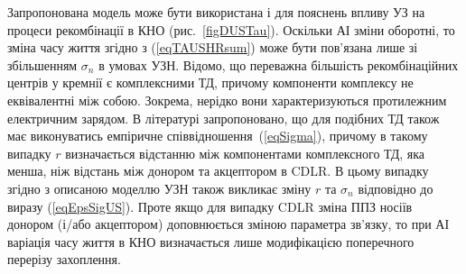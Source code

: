 Запропонована модель може бути використана і для пояснень впливу УЗ на процеси рекомбінації в КНО (рис.~\ref{figDUSTau}).
Оскільки АІ зміни оборотні, то зміна часу життя згідно з (\ref{eqTAUSHRsum}) може бути пов'язана лише зі збільшенням
$\sigma_n$ в умовах УЗН.
Відомо, що переважна більшість рекомбінаційних центрів у кремнії є комплексними ТД,
причому компоненти комплексу не еквівалентні між собою.
Зокрема, нерідко вони характеризуються протилежним електричним зарядом.
В літературі \cite{CDLR:R2} запропоновано, що для подібних ТД також має виконуватись емпіричне співвідношення~(\ref{eqSigma}),
причому в такому випадку $r$ визначається відстанню між компонентами комплексного ТД, яка  менша, ніж відстань між донором та акцептором в CDLR.
В цьому випадку згідно з описаною моделлю УЗН також викликає зміну $r$ та $\sigma_n$ відповідно до виразу (\ref{eqEpsSigUS}).
Проте якщо для випадку CDLR зміна ППЗ носіїв донором (і/або акцептором) доповнюється зміною параметра зв'язку,
то при АІ варіація часу життя в КНО визначається лише модифікацією поперечного перерізу захоплення.

